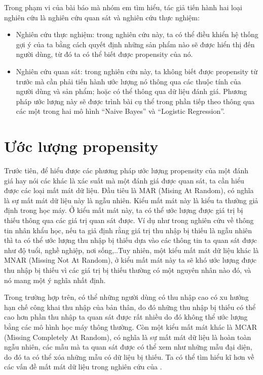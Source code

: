 Trong phạm vi của bài báo mà nhóm em tìm hiểu, tác giả tiến hành hai loại nghiên cứu là nghiên cứu quan sát và nghiên cứu thực nghiệm:
\begin{itemize}
    \item Nghiên cứu thực nghiệm: trong nghiên cứu này, ta có thể điều khiển hệ thống gợi ý của ta bằng cách quyết định những sản phẩm nào sẽ được hiển thị đến người dùng, từ đó ta có thể biết được propensity của nó.
    \item Nghiên cứu quan sát: trong nghiên cứu này, ta không biết được propensity từ trước mà cần phải tiến hành ước lượng nó thông qua các thuộc tính của người dùng và sản phẩm; hoặc có thể thông qua dữ liệu đánh giá. Phương pháp ước lượng này sẽ được trình bài cụ thể trong phần tiếp theo thông qua các một trong hai mô hình ``Naive Bayes'' và ``Logistic Regression''.
\end{itemize}
\section{Ước lượng propensity}
\label{sec:3_estimate}
Trước tiên, để hiểu được các phương pháp ước lượng propensity của một đánh giá hay nói các khác là xác suất mà một đánh giá được quan sát, ta cần hiểu được các loại mất mát dữ liệu. Đầu tiêu là MAR (Mising At Random), có nghĩa là sự mất mát dữ liệu này là ngẫu nhiên. Kiểu mất mát này là kiểu ta thường giả định trong học máy. Ở kiểu mất mát này, ta có thể ước lượng được giá trị bị thiếu thông qua các giá trị quan sát được. Ví dụ như trong nghiên cứu về thông tin nhân khẩu học, nếu ta giả định rằng giá trị thu nhập bị thiếu là ngẫu nhiên thì ta có thể ước lượng thu nhập bị thiếu dựa vào các thông tin ta quan sát được như độ tuổi, nghề nghiệp, nơi sống,..Tuy nhiên,  một kiểu mất mát dữ liệu khác là MNAR (Missing Not At Random), ở kiểu mất mát này ta sẽ khó ước lượng được thu nhập bị thiếu vì các giá trị bị thiếu thường có một nguyên nhân nào đó, và nó mang một ý nghĩa nhất định.

Trong trường hợp trên, có thể những người dùng có thu nhập cao có xu hướng hạn chế công khai thu nhập của bản thân, do đó những thu nhập bị thiếu có thể cao hơn phần thu nhập ta quan sát được rất nhiều do đó không thể ước lượng bằng các mô hình học máy thông thường. Còn một kiểu mất mát khác là MCAR (Missing Completely At Random), có nghĩa là sự mất mát dữ liệu là hoàn toàn ngẫu nhiên, các mẫu mà ta quan sát được có thể xem như những mẫu đại diện, do đó ta có thể xóa những mẫu có dữ liệu bị thiếu. Ta có thể tìm hiểu kĩ hơn về các vấn đề mất mát dữ liệu trong nghiên cứu của \cite{rubin_2002}.

